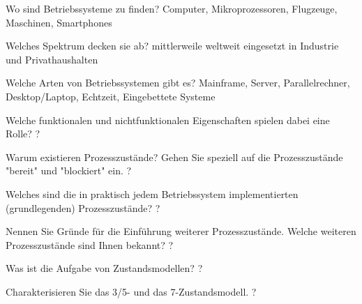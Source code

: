 \documentclass[avery5371]{flashcards}
\begin{document}
\begin{flashcard}[Einführung]{Wo sind Betriebssysteme zu finden?}
    Computer, Mikroprozessoren, Flugzeuge, Maschinen, Smartphones
\end{flashcard}

\begin{flashcard}[Einführung]{Welches Spektrum decken sie ab?}
    mittlerweile weltweit eingesetzt in Industrie und Privathaushalten 
\end{flashcard}

\begin{flashcard}[Einführung]{Welche Arten von Betriebssystemen gibt es?}
    Mainframe, Server, Parallelrechner, Desktop/Laptop, Echtzeit, Eingebettete Systeme
\end{flashcard}

\begin{flashcard}[Einführung]{Welche funktionalen und nichtfunktionalen Eigenschaften spielen dabei eine Rolle?}
    ?
\end{flashcard}
\begin{flashcard}{Warum existieren Prozesszustände? Gehen Sie speziell auf die Prozesszustände "bereit" und "blockiert" ein.}
    ?
\end{flashcard}

\begin{flashcard}{Welches sind die in praktisch jedem Betriebssystem implementierten (grundlegenden) Prozesszustände?}
    ?
\end{flashcard}

\begin{flashcard}{Nennen Sie Gründe für die Einführung weiterer Prozesszustände. Welche weiteren Prozesszustände sind Ihnen bekannt?}
    ?
\end{flashcard}

\begin{flashcard}{Was ist die Aufgabe von Zustandsmodellen?}
    ?
\end{flashcard}

\begin{flashcard}{Charakterisieren Sie das 3/5- und das 7-Zustandsmodell.}
    ?
\end{flashcard}
\end{document}
